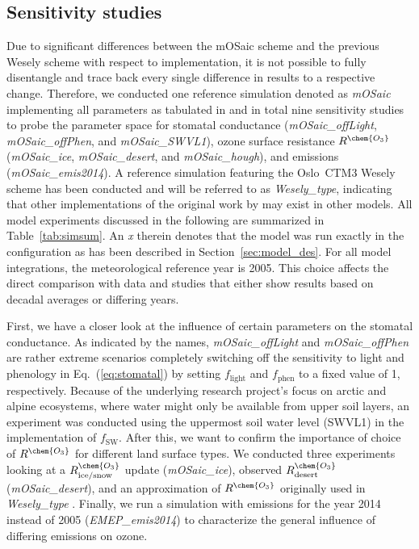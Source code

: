 \documentclass[gmd, manuscript]{copernicus}
\begin{document}
\subsection{Sensitivity studies}
\label{subsec:sens}
Due to significant differences between the mOSaic scheme and the previous Wesely scheme with respect to implementation, it is not possible to fully disentangle and trace back every single difference in results to a respective change. Therefore, we conducted one reference simulation denoted as \emph{mOSaic} implementing all parameters as tabulated in \citet{ACP:Simpson2012} and in total nine sensitivity studies to probe the parameter space for stomatal conductance (\emph{mOSaic\_offLight}, \emph{mOSaic\_offPhen}, and \emph{mOSaic\_SWVL1}), ozone surface resistance $R^\chem{O_3}$ (\emph{mOSaic\_ice}, \emph{mOSaic\_desert}, and \emph{mOSaic\_hough}), and emissions (\emph{mOSaic\_emis2014}). A reference simulation featuring the Oslo~CTM3 Wesely scheme has been conducted and will be referred to as \emph{Wesely\_type}, indicating that other implementations of the original work by \citet{AE:Wesely1989} may exist in other models.
All model experiments discussed in the following are summarized in Table~\ref{tab:simsum}. An \emph{x} therein denotes that the model was run exactly in the configuration as has been described in Section~\ref{sec:model_des}.
For all model integrations, the meteorological reference year is 2005. This choice affects the direct comparison with data and studies that either show results based on decadal averages or differing years.

First, we have a closer look at the influence of certain parameters on the stomatal conductance. As indicated by the names, \emph{mOSaic\_offLight} and \emph{mOSaic\_offPhen} are rather extreme scenarios completely switching off the sensitivity to light and phenology in Eq.~(\ref{eq:stomatal}) by setting $f_\text{light}$ and $f_\text{phen}$ to a fixed value of 1, respectively. Because of the underlying research project's focus on arctic and alpine ecosystems, where water might only be available from upper soil layers, an experiment was conducted using the uppermost soil water level (SWVL1) in the implementation of $f_\text{SW}$. 
After this, we want to confirm the importance of choice of $R^\chem{O_3}$ for different land surface types. We conducted three experiments looking at a $R^\chem{O_3}_\text{ice/snow}$ update \citep{ACP:Helmig2007} (\emph{mOSaic\_ice}), observed $R^\chem{O_3}_\text{desert}$ \citep{AE:Gusten1995} (\emph{mOSaic\_desert}), and an approximation of $R^\chem{O_3}$ originally used in \emph{Wesely\_type} \citep{AE:Wesely1989, JGR:Hough1991}.
Finally, we run a simulation with emissions for the year 2014 instead of 2005 (\emph{EMEP\_emis2014}) to characterize the general influence of differing emissions on ozone.  
\end{document}
